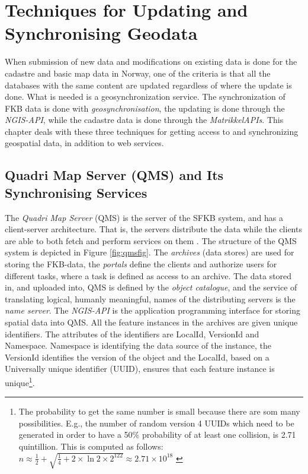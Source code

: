 \chapter{Techniques for Updating and Synchronising Geodata} \label{chap:tech}
When submission of new data and modifications on existing data is done for the cadastre and basic map data in Norway, one of the criteria is that all the databases with the same content are updated regardless of where the update is done. What is needed is a geosynchronization service. The synchronization of FKB data is done with \textit{geosynchronisation}, the updating is done through the \textit{NGIS-API}, while the cadastre data is done through the \textit{MatrikkelAPIs}.  This chapter deals with these three techniques for getting access to and synchronizing geospatial data, in addition to web services.  


\section{Quadri Map Server (QMS) and Its Synchronising Services}\label{ngis}
The \textit{Quadri Map Server} (QMS) is the server of the SFKB system,
and has a client-server architecture. That is, the servers distribute the data while the clients are able to both fetch and perform services on them \citep{NorkartAS2010}. 
The structure of the QMS system
is depicted in Figure \ref{fig:qmsfig}. The \textit{archives} (data stores) are used for storing the FKB-data, the \textit{portals} define the clients and authorize users for different tasks, where a task is defined as access to an archive. The data stored in, and uploaded into, QMS is defined by the \textit{object catalogue}, and the service of translating logical, humanly meaningful, names of the distributing servers is the \textit{name server}. The \textit{NGIS-API} is the application programming interface for storing spatial data into QMS. All the feature instances in the archives are given unique identifiers. The attributes of the identifiers are LocalId, VersionId and Namespace. Namespace is identifying the data source of the instance, the VersionId identifies the version of the object and the LocalId, based on a Universally unique identifier (UUID), ensures that each feature instance is unique\footnote{The probability to get the same number is small because there are som many possibilities. E.g., the number of random version 4 UUIDs which need to be generated in order to have a 50\% probability of at least one collision, is 2.71 quintillion. This is computed as follows: $ n \approx \frac{1}{2} + \sqrt{\frac{1}{4}+2 \times \ln{2} \times  2^{122}} \approx 2.71 \times 10^{18} $ \citep{Eggan2017}}. 
 
